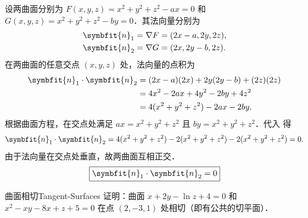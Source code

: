 \begin{myproof}
    设两曲面分别为 $F(x, y, z) = x^2 + y^2 + z^2 - ax = 0$ 和 $G(x, y, z) = x^2 + y^2 + z^2 - by = 0$．其法向量分别为
    \begin{equation}\label{eq:normals-1}
        \begin{aligned}
            \symbfit{n}_1 & = \nabla F = (2x - a, 2y, 2z), \\
            \symbfit{n}_2 & = \nabla G = (2x, 2y - b, 2z).
        \end{aligned}
    \end{equation}
    在两曲面的任意交点 $(x, y, z)$ 处，法向量的点积为
    \begin{equation}\label{eq:dot-product-1}
        \begin{aligned}
            \symbfit{n}_1 \cdot \symbfit{n}_2 & = (2x - a)(2x) + 2y(2y - b) + (2z)(2z) \\
                                              & = 4x^2 - 2ax + 4y^2 - 2by + 4z^2       \\
                                              & = 4(x^2 + y^2 + z^2) - 2ax - 2by.
        \end{aligned}
    \end{equation}
    根据曲面方程，在交点处满足 $ax = x^2 + y^2 + z^2$ 且 $by = x^2 + y^2 + z^2$．代入  得
    \begin{equation}
        \symbfit{n}_1 \cdot \symbfit{n}_2 = 4(x^2 + y^2 + z^2) - 2(x^2 + y^2 + z^2) - 2(x^2 + y^2 + z^2) = 0.
    \end{equation}
    由于法向量在交点处垂直，故两曲面互相正交．
    \begin{equation}
        \boxed{\symbfit{n}_1 \cdot \symbfit{n}_2 = 0}
    \end{equation}
\end{myproof}


\begin{problem}{曲面相切}{Tangent-Surfaces}
    证明：曲面 $x + 2y - \ln z + 4 = 0$ 和 $x^2 - xy - 8x + z + 5 = 0$ 在点 $(2, -3, 1)$ 处相切（即有公共的切平面）．
\end{problem}

